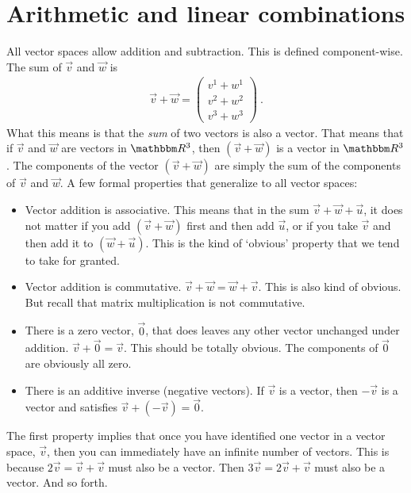 \documentclass[12pt, oneside]{report}    %
\let\oldsection\section
\def\section{%
  \setcounter{sidenote}{1}%
  \oldsection
}
\begin{document}
\section{Arithmetic and linear combinations}

All vector spaces allow addition and subtraction. This is defined component-wise. The sum of $\vec{v}$ and $\vec{w}$ is
\begin{align}
    \vec{v}+\vec{w} = 
    \begin{pmatrix}
        v^1 + w^1\\
        v^2 + w^2\\
        v^3 + w^3
    \end{pmatrix} \ .
\end{align}
What this means is that the \emph{sum} of two vectors is also a vector. That means that if $\vec{v}$ and $\vec{w}$ are vectors in $\RR ^3$, then $(\vec{v}+\vec{w})$ is a vector in $\RR ^3$. The components of the vector $(\vec{v}+\vec{w})$ are simply the sum of the components of $\vec{v}$ and $\vec{w}$. 
% 
A few formal properties that generalize to all vector spaces:
\begin{itemize}
    \item Vector addition is associative. This means that in the sum $\vec{v}+\vec{w}+\vec{u}$, it does not matter if you add $(\vec{v}+\vec{w})$ first and then add $\vec{u}$, or if you take $\vec{v}$ and then add it to $(\vec{w}+\vec{u})$. This is the kind of `obvious' property that we tend to take for granted.
    \item Vector addition is commutative. $\vec{v}+\vec{w} = \vec{w}+\vec{v}$. This is also kind of obvious. But recall that matrix multiplication is not commutative.
    \item There is a zero vector, $\vec{0}$, that does leaves any other vector unchanged under addition. $\vec{v}+\vec{0} = \vec{v}$. This should be totally obvious. The components of $\vec{0}$ are obviously all zero.
    \item There is an additive inverse (negative vectors). If $\vec{v}$ is a vector, then $-\vec{v}$ is a vector and satisfies $\vec{v}+(-\vec{v}) = \vec{0}$.
\end{itemize}
\begin{example}
The first property implies that once you have identified one vector in a vector space, $\vec{v}$, then you can immediately have an infinite number of vectors. This is because $2\vec{v} = \vec{v}+\vec{v}$ must also be a vector. Then $3\vec{v} = 2\vec{v}+\vec{v}$ must also be a vector. And so forth.
\end{example}
\end{document}
